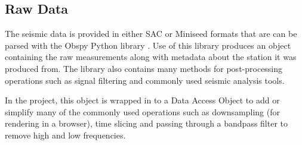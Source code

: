 \documentclass[../report.tex]{subfiles}
\begin{document}
\subsection{Raw Data}
	The seismic data is provided in either SAC or Miniseed formats that are can be parsed with the Obspy Python library 
	\citep{obspy}.  Use of this library produces an object containing the raw measurements along with metadata about the station it was produced from.  The library also contains many methods for post-processing operations such as signal filtering and commonly used seismic analysis tools.
	
	In the project, this object is wrapped in to a Data Access Object to add or simplify many of the commonly used operations such as downsampling (for rendering in a browser), time slicing and passing through a bandpass filter to remove high and low frequencies.
\end{document}
